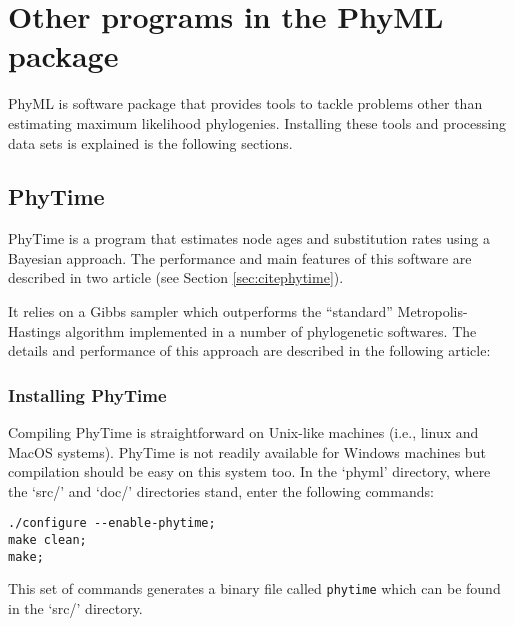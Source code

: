 \documentclass[a4paper,12pt]{article}
\newcommand{\x}[1]{\texttt{#1}}
\begin{document}
\section{Other programs in the PhyML package}

PhyML  is software package  that provides  tools to  tackle problems  other than  estimating maximum
likelihood  phylogenies.  Installing these  tools  and  processing data  sets  is  explained is  the
following sections.

\subsection{PhyTime} PhyTime is  a program that estimates node  ages and substitution
rates using a Bayesian  approach.  The performance and main features of  this software are described
in two article (see Section \ref{sec:citephytime}).

It  relies on  a  Gibbs  sampler which  outperforms  the
``standard'' Metropolis-Hastings algorithm  implemented in a number of  phylogenetic softwares.  The
details  and performance  of  this  approach are  described  in the  following  article: 

\subsubsection{Installing PhyTime}

Compiling PhyTime is straightforward on Unix-like  machines (i.e., linux and MacOS systems). PhyTime
is not readily available for Windows machines but  compilation should be easy on this system too. In
the `phyml' directory, where the `src/'  and `doc/' directories stand, enter the following commands:
{\setlength{\baselineskip}{0.5\baselineskip}
\begin{verbatim}
./configure --enable-phytime;
make clean;
make;
\end{verbatim} } This set of commands generates  a binary file called \x{phytime} which can be found
  in the `src/' directory.
\end{document}
